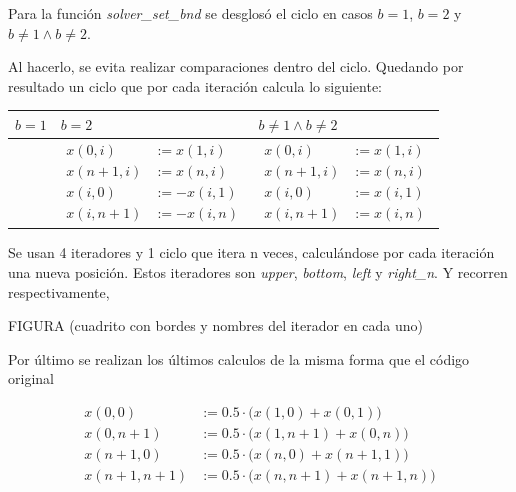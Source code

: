 Para la función {\it solver_set_bnd\/} se desglosó el ciclo en casos $b = 1$,
$b = 2$ y $b \neq 1 \land b \neq 2$.

Al hacerlo, se evita realizar comparaciones dentro del ciclo. Quedando por
resultado un ciclo que por cada iteración calcula lo siguiente:

\begin{center}
  \begin{tabular}{| >{\centering\arraybackslash}m{2in} | >{\centering\arraybackslash}m{2in} | >{\centering\arraybackslash}m{2in} |}
    \hline
    $b = 1$              & $b = 2$              & $b \neq 1 \land b \neq 2$ \\\hline
{
\setlength{\abovedisplayskip}{0pt}
\setlength{\belowdisplayskip}{0pt}
\begin{align*}
  x(0,i) &:= -x(1,i)\\ x(n+1,i) &:= -x(n,i)\\  x(i,0) &:= x(i,1)\\ x(i,n+1) &:= x(i,n)
\end{align*}
} & {
\setlength{\abovedisplayskip}{0pt}
\setlength{\belowdisplayskip}{0pt}
\begin{align*}
  x(0,i) &:= x(1,i)\\ x(n+1,i) &:= x(n,i)\\ x(i,0) &:= -x(i,1)\\ x(i,n+1) &:= -x(i,n)
\end{align*}
} & {
\setlength{\abovedisplayskip}{0pt}
\setlength{\belowdisplayskip}{0pt}
\begin{align*}
  x(0,i) &:= x(1,i)\\ x(n+1,i) &:= x(n,i)\\  x(i,0) &:= x(i,1)\\ x(i,n+1) &:= x(i,n)
\end{align*}} \\\hline
  \end{tabular}
\end{center}

Se usan 4 iteradores y 1 ciclo que itera n veces, calculándose por cada
iteración una nueva posición.
Estos iteradores son {\it upper\/}, {\it bottom\/}, {\it left\/} y {\it right_n\/}.
Y recorren respectivamente,

FIGURA (cuadrito con bordes y nombres del iterador en cada uno)

Por último se realizan los últimos calculos de la misma forma que el código
original

{
\setlength{\abovedisplayskip}{-5pt}
\setlength{\belowdisplayskip}{-20pt}
\begin{align*}
  x(0  ,0  ) &:= 0.5\cdot\bigl(x(1,0  )+x(0  ,1)\bigr)\\
  x(0  ,n+1) &:= 0.5\cdot\bigl(x(1,n+1)+x(0  ,n)\bigr)\\
  x(n+1,0  ) &:= 0.5\cdot\bigl(x(n,0  )+x(n+1,1)\bigr)\\
  x(n+1,n+1) &:= 0.5\cdot\bigl(x(n,n+1)+x(n+1,n)\bigr)\\
\end{align*}
}

